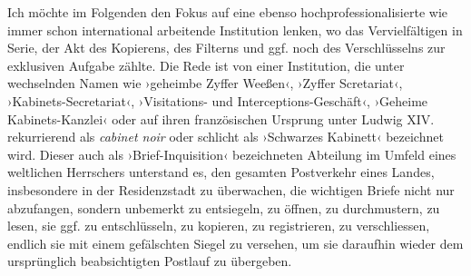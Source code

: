 \documentclass[a4paper,11pt]{article}
\newcommand{\inanf}[1]{›#1‹}
\begin{document}


Ich möchte im Folgenden den Fokus auf eine ebenso hochprofessionalisierte wie immer schon international arbeitende Institution lenken, wo das Vervielfältigen in Serie, der Akt des Kopierens, des Filterns und ggf. noch des Verschlüsselns zur exklusiven Aufgabe zählte. Die Rede ist von einer Institution, die unter wechselnden Namen wie ›geheimbe Zyffer Weeßen‹, ›Zyffer Scretariat‹, ›Kabinets-Secretariat‹, ›Visitations- und Interceptions-Geschäft‹, ›Geheime Kabinets-Kanzlei‹ oder auf ihren französischen Ursprung unter Ludwig XIV. rekurrierend als \emph{cabinet noir} oder schlicht als \inanf{Schwarzes Kabinett} bezeichnet wird. Dieser auch als \inanf{Brief-Inquisition} bezeichneten Abteilung im Umfeld eines weltlichen Herrschers unterstand es, den gesamten Postverkehr eines Landes, insbesondere in der Residenzstadt zu überwachen, die wichtigen Briefe nicht nur abzufangen, sondern unbemerkt zu entsiegeln, zu öffnen, zu durchmustern, zu lesen, sie ggf. zu entschlüsseln, zu kopieren, zu registrieren, zu verschliessen, endlich sie mit einem gefälschten Siegel zu versehen, um sie daraufhin wieder dem ursprünglich beabsichtigten Postlauf zu übergeben. 
\end{document}
